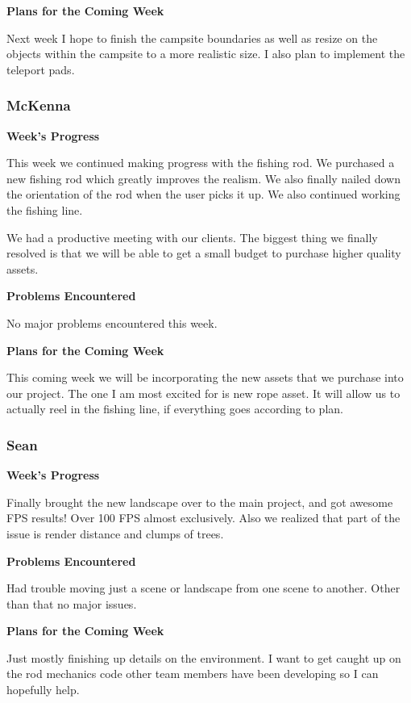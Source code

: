 \documentclass[10pt,journal,compsoc,onecolumn, draftclsnofoot]{IEEEtran}
\begin{document}
\noindent \textbf{Plans for the Coming Week}

Next week I hope to finish the campsite boundaries as well as resize on the objects within the campsite to a more realistic size. I also plan to implement the teleport pads.

\subsubsection{McKenna}
\noindent \textbf{Week's Progress}

This week we continued making progress with the fishing rod. We purchased a new fishing rod which greatly improves the realism. We also finally nailed down the orientation of the rod when the user picks it up. We also continued working the fishing line.

We had a productive meeting with our clients. The biggest thing we finally resolved is that we will be able to get a small budget to purchase higher quality assets.

\noindent \textbf{Problems Encountered}

No major problems encountered this week.

\noindent \textbf{Plans for the Coming Week}

This coming week we will be incorporating the new assets that we purchase into our project. The one I am most excited for is new rope asset. It will allow us to actually reel in the fishing line, if everything goes according to plan.

\subsubsection{Sean}
\noindent \textbf{Week's Progress}

Finally brought the new landscape over to the main project, and got awesome FPS results! Over 100 FPS almost exclusively. Also we realized that part of the issue is render distance and clumps of trees.

\noindent \textbf{Problems Encountered}

Had trouble moving just a scene or landscape from one scene to another.  Other than that no major issues.

\noindent \textbf{Plans for the Coming Week}

Just mostly finishing up details on the environment. I want to get caught up on the rod mechanics code other team members have been developing so I can hopefully help.
\end{document}
